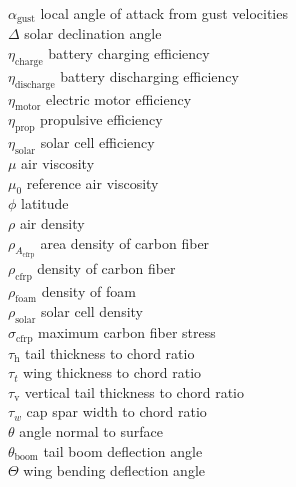 \begin{multicols}{2}
\begin{tabbing}
$\alpha_{\text{gust}}$ \> local angle of attack from gust velocities \\ %
$\Delta$ \> solar declination angle \\
$\eta_{\text{charge}}$ \> battery charging efficiency \\
$\eta_{\text{discharge}}$ \> battery discharging efficiency \\
$\eta_{\text{motor}}$ \> electric motor efficiency \\
$\eta_{\text{prop}}$ \> propulsive efficiency \\
$\eta_{\text{solar}}$ \> solar cell efficiency \\
$\mu$ \> air viscosity \\ %
$\mu_0$ \> reference air viscosity \\ %
$\phi$ \> latitude \\
$\rho$ \> air density \\ %
$\rho_{A_{\text{cfrp}}}$ \> area density of carbon fiber \\ %
$\rho_{\text{cfrp}}$ \> density of carbon fiber \\ %
$\rho_{\text{foam}}$ \> density of foam \\ %
$\rho_{\text{solar}}$ \> solar cell density \\ %
$\sigma_{\text{cfrp}}$ \> maximum carbon fiber stress \\ %
$\tau_{\text{h}}$ \> \DIFdelbegin {}\DIFdelend \DIFaddbegin {}\DIFaddend tail thickness to chord ratio \\
$\tau_t$ \> wing thickness to chord ratio \\
$\tau_{\text{v}}$ \> vertical tail thickness to chord ratio \\
$\tau_w$ \> cap spar width to chord ratio \\
$\theta$ \> angle normal to surface \\
$\theta_{\text{boom}}$ \> tail boom deflection angle \\
$\Theta$ \> wing bending deflection angle 
 \end{tabbing}

\end{multicols}

